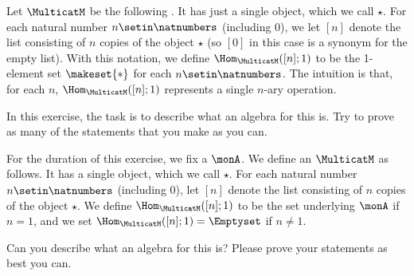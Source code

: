 {%


\begin{gradedexercise}
    \label{ex:MonoidsAsAlgebras}
    Let $\MulticatM$ be the following .
    It has just a single object, which we call $\star$.
    For each natural number $n \setin \natnumbers$ (including $0$), we let $[n]$ denote the list consisting of $n$ copies of the object $\star$ (so $[0]$ in this case is a synonym for the empty list).
    With this notation, we define $\Hom_\MulticatM([n];1)$ to be the 1-element set $\makeset{ * }$ for each $n \setin \natnumbers$.
    The intuition is that, for each $n$, $\Hom_\MulticatM([n];1)$ represents a single $n$-ary operation.

    In this exercise, the task is to describe what an algebra for this  is.
    Try to prove as many of the statements that you make as you can.
\end{gradedexercise}



\begin{gradedexercise}
    \label{ex:MonoidsActionsAsAlgebras}
    For the duration of this exercise, we fix a  $\monA$.
    We define an $\MulticatM$ as follows.
    It has a single object, which we call $\star$.
    For each natural number $n \setin \natnumbers$ (including $0$), let $[n]$ denote the list consisting of $n$ copies of the object $\star$.
    We define $\Hom_\MulticatM([n];1)$ to be the set underlying $\monA$ if $n =1$, and we set $\Hom_\MulticatM([n];1) = \Emptyset$ if $n \neq 1$.

    Can you describe what an algebra for this  is?
    Please prove your statements as best you can.
\end{gradedexercise}


}
